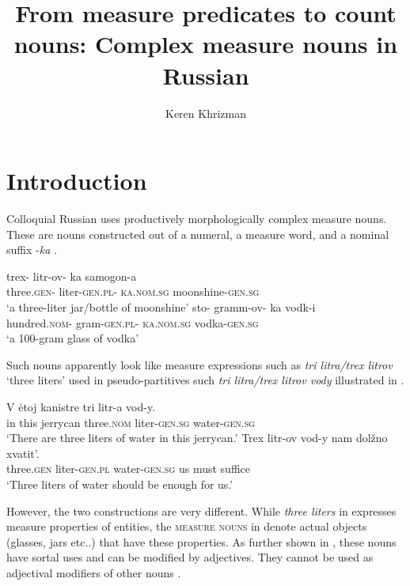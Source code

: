 \documentclass[output=paper,
colorlinks,
citecolor=brown,
newtxmath
]{langscibook}
\author{Keren Khrizman\affiliation{Bar-Ilan University}}
\title{From measure predicates to count nouns: Complex measure nouns in Russian}
\begin{document}
\maketitle

%


\section{Introduction}
Colloquial Russian uses productively morphologically complex measure nouns. These are nouns constructed out of a numeral, a measure word, and a nominal suffix -\textit{ka} .

\ea\label{ex:1}
    \ea\label{ex:1a} \gll trex- litr-ov- ka samogon-a\\
    three.\textsc{gen}- liter-\textsc{gen.pl}- \textsc{ka.nom.sg} moonshine-\textsc{gen.sg}\\
    \glt `a three-liter jar/bottle of moonshine'
    \ex\label{ex:1b} \gll sto- gramm-ov- ka vodk-i\\
    hundred.\textsc{nom}- gram-\textsc{gen.pl}- \textsc{ka.nom.sg} vodka-\textsc{gen.sg}\\
    \glt `a 100-gram glass of vodka'
\z\z

\noindent Such nouns apparently look like measure expressions such as \textit{tri litra/trex litrov} `three liters' used in pseudo-partitives such \textit{tri litra/trex litrov vody} illustrated in .

\ea\label{ex:2}
    \ea\label{ex:2a} \gll V ėtoj kanistre tri litr-a vod-y.\\
    in this jerrycan three.\textsc{nom} liter-\textsc{gen.sg} water-\textsc{gen.sg}\\
    \glt `There are three liters of water in this jerrycan.'
    \ex\label{ex:2b} \gll Trex litr-ov vod-y nam dolžno xvatit’.\\
    three.\textsc{gen} liter-\textsc{gen.pl} water-\textsc{gen.sg} us must suffice\\
    \glt `Three liters of water should be enough for us.'
\z\z

\noindent However, the two constructions are very different. While \textit{three liters} in  expresses measure properties of entities, the \textsc{measure nouns} in  denote actual objects (glasses, jars etc..) that have these properties. As further shown in , these nouns have sortal uses and can be modified by adjectives. They cannot be used as adjectival modifiers of other nouns .
\end{document}
